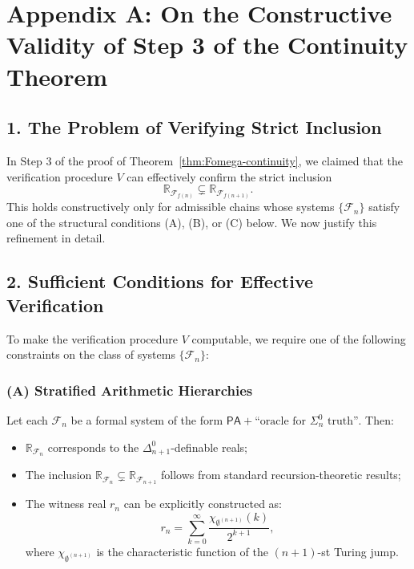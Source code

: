 \documentclass[12pt]{article}
\theoremstyle{definition}
\theoremstyle{plain}
\theoremstyle{remark}
\begin{document}
\clearpage
\appendix
\section*{Appendix A: On the Constructive Validity of Step 3 of the Continuity Theorem}
\label{appendix:step3-validity}

\subsection*{1. The Problem of Verifying Strict Inclusion}

In Step 3 of the proof of Theorem~\ref{thm:Fomega-continuity}, we claimed that the verification procedure \( V \) can effectively confirm the strict inclusion
\[
\mathbb{R}_{\mathcal{F}_{f(n)}} \subsetneq \mathbb{R}_{\mathcal{F}_{f(n+1)}}.
\]
This holds constructively only for admissible chains whose systems \( \{\mathcal{F}_n\} \) satisfy one of the structural conditions (A), (B), or (C) below. We now justify this refinement in detail.

\subsection*{2. Sufficient Conditions for Effective Verification}

To make the verification procedure \( V \) computable, we require one of the following constraints on the class of systems \( \{\mathcal{F}_n\} \):

\subsubsection*{(A) Stratified Arithmetic Hierarchies}

Let each \( \mathcal{F}_n \) be a formal system of the form \( \mathsf{PA} + \text{``oracle for } \Sigma^0_n \text{ truth''} \). Then:
\begin{itemize}
    \item \( \mathbb{R}_{\mathcal{F}_n} \) corresponds to the \( \Delta^0_{n+1} \)-definable reals;
    \item The inclusion \( \mathbb{R}_{\mathcal{F}_n} \subsetneq \mathbb{R}_{\mathcal{F}_{n+1}} \) follows from standard recursion-theoretic results;
    \item The witness real \( r_n \) can be explicitly constructed as:
    \[
    r_n = \sum_{k=0}^\infty \frac{\chi_{\emptyset^{(n+1)}}(k)}{2^{k+1}},
    \]
    where \( \chi_{\emptyset^{(n+1)}} \) is the characteristic function of the \( (n+1) \)-st Turing jump.
\end{itemize}
\end{document}
